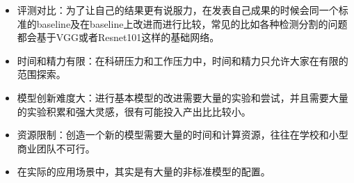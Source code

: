 \begin{itemize}
\item
  评测对比：为了让自己的结果更有说服力，在发表自己成果的时候会同一个标准的baseline及在baseline上改进而进行比较，常见的比如各种检测分割的问题都会基于VGG或者Resnet101这样的基础网络。
\item
  时间和精力有限：在科研压力和工作压力中，时间和精力只允许大家在有限的范围探索。
\item
  模型创新难度大：进行基本模型的改进需要大量的实验和尝试，并且需要大量的实验积累和强大灵感，很有可能投入产出比比较小。
\item
  资源限制：创造一个新的模型需要大量的时间和计算资源，往往在学校和小型商业团队不可行。
\item
  在实际的应用场景中，其实是有大量的非标准模型的配置。
\end{itemize}










